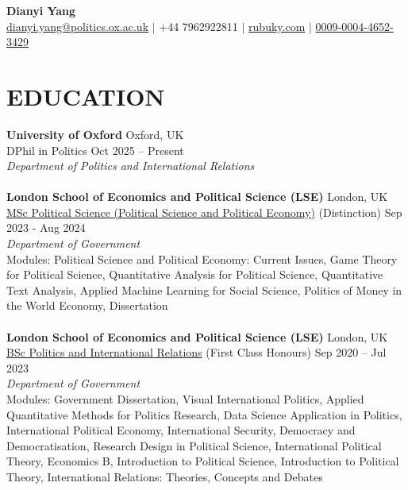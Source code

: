 \documentclass[a4paper,9pt]{extarticle}
\begin{document}
\pagestyle{empty}

\begin{center}
\textbf{\huge Dianyi Yang}\\[2pt] %
\label{CV}
\href{mailto:dianyi.yang@politics.ox.ac.uk}{dianyi.yang@politics.ox.ac.uk} $\mid$ +44 7962922811 $\mid$ \href{https://www.rubuky.com/}{rubuky.com} $\mid$ \href{https://orcid.org/0009-0004-4652-3429}{0009-0004-4652-3429} %
\end{center}

\section*{EDUCATION}
\textbf{University of Oxford} \hfill Oxford, UK \\
DPhil in Politics \hfill Oct 2025 – Present \\
\textit{Department of Politics and International Relations}\vspace{0.1cm} %
\\~\\
\noindent
\textbf{London School of Economics and Political Science (LSE)} \hfill London, UK \\ \href{https://www.lse.ac.uk/resources/calendar2023-2024/programmeRegulations/taughtMasters/2023/MScPoliticalSciencePoliticalScienceAndPoliticalEconomy.htm}{MSc Political Science (Political Science and Political Economy)}  (Distinction)  \hfill Sep 2023 - Aug 2024\\ %
\textit{Department of Government}\vspace{0.1cm}\\ %
Modules: Political Science and Political Economy: Current Issues, Game Theory for Political Science, Quantitative Analysis for Political Science, Quantitative Text Analysis, Applied Machine Learning for Social Science, Politics of Money in the World Economy, Dissertation
\\~\\
\noindent
\textbf{London School of Economics and Political Science (LSE)} \hfill London, UK \\ \href{https://www.lse.ac.uk/resources/calendar2023-2024/programmeRegulations/undergraduate/2020/BScPoliticsAndInternationalRelations.htm}{BSc Politics and International Relations} (First Class Honours) \hfill Sep 2020 – Jul 2023 \\
\textit{Department of Government}\vspace{0.1cm}\\ %
Modules: Government Dissertation, Visual International Politics, Applied Quantitative Methods for Politics Research, Data Science Application in Politics, International Political Economy, International Security, Democracy and Democratisation, Research Design in Political Science, International Political Theory, Economics B, Introduction to Political Science, Introduction to Political Theory, International Relations: Theories, Concepts and Debates
\end{document}
